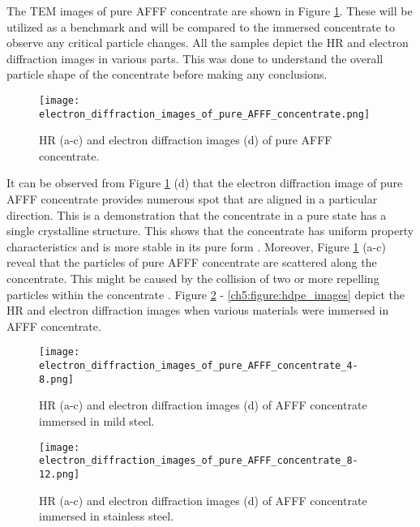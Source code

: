 The TEM images of pure AFFF concentrate are shown in Figure \ref{ch5:figure:pure_afff_images}. These will be utilized as a benchmark and will be compared to the immersed concentrate to observe any critical particle changes. All the samples depict the HR and electron diffraction images in various parts. This was done to understand the overall particle shape of the concentrate before making any conclusions. 

\begin{figure}[H]
\centering
\texttt{[image: electron\_diffraction\_images\_of\_pure\_AFFF\_concentrate.png]}

\caption{HR (a-c) and electron diffraction images (d) of pure AFFF concentrate.}
\label{ch5:figure:pure_afff_images}
\end{figure}

It can be observed from Figure \ref{ch5:figure:pure_afff_images} (d) that the electron diffraction image of pure AFFF concentrate provides numerous spot that are aligned in a particular direction. This is a demonstration that the concentrate in a pure state has a single crystalline structure. This shows that the concentrate has uniform property characteristics and is more stable in its pure form \cite{coates1996interpretation}.  Moreover, Figure \ref{ch5:figure:pure_afff_images} (a-c) reveal that the particles of pure AFFF concentrate are scattered along the concentrate. This might be caused by the collision of two or more repelling particles within the concentrate \cite{bellamy1980infrared}. Figure \ref{ch5:figure:mild_steel_images} - \ref{ch5:figure:hdpe_images} depict the HR and electron diffraction images when various materials were immersed in AFFF concentrate. 
  
\begin{figure}[H]
\centering

\texttt{[image: electron\_diffraction\_images\_of\_pure\_AFFF\_concentrate\_4-8.png]}

\caption{HR (a-c) and electron diffraction images (d) of AFFF concentrate immersed in mild steel.}
\label{ch5:figure:mild_steel_images}
\end{figure}

\begin{figure}[H]
\centering

\texttt{[image: electron\_diffraction\_images\_of\_pure\_AFFF\_concentrate\_8-12.png]}

\caption{HR (a-c) and electron diffraction images (d) of AFFF concentrate immersed in stainless steel.}
\label{ch5:figure:stainless_steel_images}
\end{figure}

